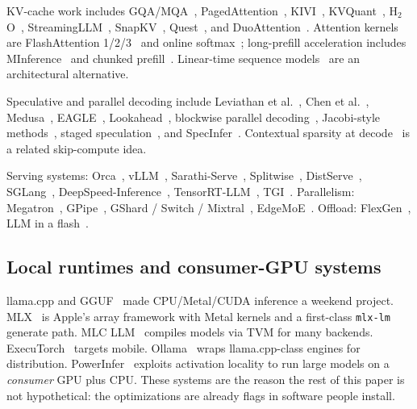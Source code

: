 KV-cache work includes GQA/MQA~\citep{shazeer2019mqa,ainslie2023gqa}, PagedAttention~\citep{kwon2023vllm}, KIVI~\citep{liu2024kivi}, KVQuant~\citep{hooper2024kvquant}, H$_2$O~\citep{zhang2023h2o}, StreamingLLM~\citep{xiao2024streamingllm}, SnapKV~\citep{li2024snapkv}, Quest~\citep{tang2024quest}, and DuoAttention~\citep{xiao2024duoattention}. Attention kernels are FlashAttention 1/2/3~\citep{dao2022flashattention,dao2023flashattention2,dao2024flashattention3} and online softmax~\citep{milakov2018online}; long-prefill acceleration includes MInference~\citep{jiang2024minference} and chunked prefill~\citep{agrawal2023sarathipreprint}. Linear-time sequence models~\citep{gu2023mamba} are an architectural alternative.

Speculative and parallel decoding include Leviathan et al.~\citep{leviathan2023speculative}, Chen et al.~\citep{chen2023speculative}, Medusa~\citep{cai2024medusa}, EAGLE~\citep{li2024eagle}, Lookahead~\citep{chen2021lookahead}, blockwise parallel decoding~\citep{stern2018blockwise}, Jacobi-style methods~\citep{santilli2023jacobidecoding}, staged speculation~\citep{spector2023rest}, and SpecInfer~\citep{miao2024specinfer}. Contextual sparsity at decode~\citep{liu2024dejavu} is a related skip-compute idea.

Serving systems: Orca~\citep{yu2022orca}, vLLM~\citep{kwon2023vllm}, Sarathi-Serve~\citep{agrawal2024sarathi}, Splitwise~\citep{patel2024splitwise}, DistServe~\citep{aminabadi2024distserve}, SGLang~\citep{zheng2024sglang}, DeepSpeed-Inference~\citep{aminabadi2022deepspeed}, TensorRT-LLM~\citep{nvidia2024trtllm}, TGI~\citep{huggingface_tgi}. Parallelism: Megatron~\citep{shoeybi2019megatron,narayanan2021efficient}, GPipe~\citep{huang2019gpipe}, GShard / Switch / Mixtral~\citep{lepikhin2021gshard,fedus2022switch,jiang2024mixtral}, EdgeMoE~\citep{yi2023edgemoe}. Offload: FlexGen~\citep{sheng2023flexgen}, LLM in a flash~\citep{alizadeh2024llm}.

\subsection{Local runtimes and consumer-GPU systems}

llama.cpp and GGUF~\citep{llamacpp,gguf} made CPU/Metal/CUDA inference a weekend project. MLX~\citep{mlx2023,mlxlm2023} is Apple's array framework with Metal kernels and a first-class \texttt{mlx-lm} generate path. MLC LLM~\citep{mlcllm} compiles models via TVM for many backends. ExecuTorch~\citep{executorch} targets mobile. Ollama~\citep{ollama} wraps llama.cpp-class engines for distribution. PowerInfer~\citep{song2024powerinfer} exploits activation locality to run large models on a \emph{consumer} GPU plus CPU. These systems are the reason the rest of this paper is not hypothetical: the optimizations are already flags in software people install.

